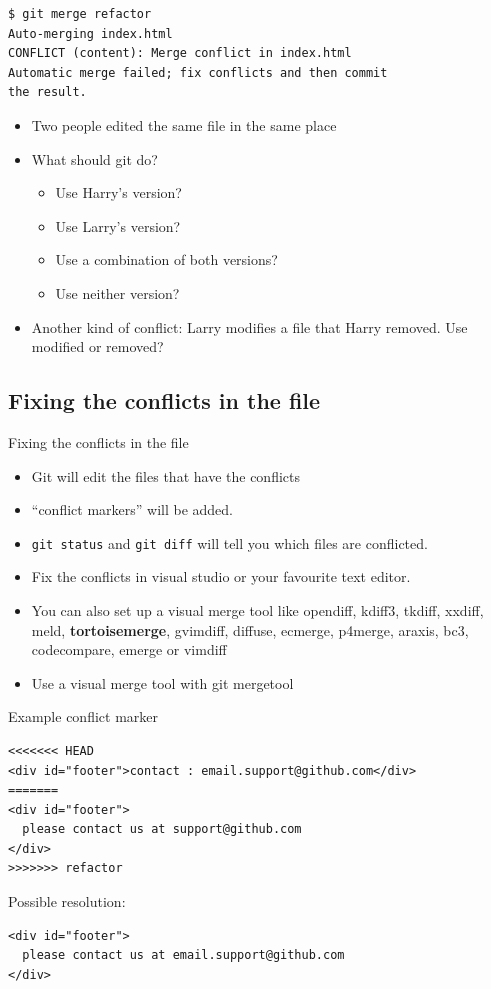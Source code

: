 \documentclass[10pt,a4paper]{beamer}
\begin{document}
\begin{frame}[fragile]
\begin{verbatim}
$ git merge refactor
Auto-merging index.html
CONFLICT (content): Merge conflict in index.html
Automatic merge failed; fix conflicts and then commit
the result.
\end{verbatim}
\begin{itemize}
	\item Two people edited the same file in the same place
	\item What should git do?
	\begin{itemize}
	\item Use Harry's version?
	\item Use Larry's version?
	\item Use a combination of both versions?
	\item Use neither version?
	\end{itemize}

	\item Another kind of conflict: Larry modifies a file that Harry removed. Use modified or removed?
\end{itemize}
\end{frame}

\subsection{Fixing the conflicts in the file}
\begin{frame}[fragile]{Fixing the conflicts in the file}
\begin{itemize}
\item Git will edit the files that have the conflicts
\item ``conflict markers'' will be added.
\item \texttt{git status} and \texttt{git diff} will tell you which files are conflicted.
\item Fix the conflicts in visual studio or your favourite text editor.
\item You can also set up a visual merge tool like opendiff, kdiff3, tkdiff, xxdiff, meld, \textbf{tortoisemerge}, gvimdiff, diffuse, ecmerge, p4merge, araxis, bc3, codecompare, emerge or vimdiff
\item Use a visual merge tool with git mergetool
\end{itemize}
\end{frame}

\begin{frame}[fragile]{Example conflict marker}
\begin{verbatim}
<<<<<<< HEAD
<div id="footer">contact : email.support@github.com</div>
=======
<div id="footer">
  please contact us at support@github.com
</div>
>>>>>>> refactor
\end{verbatim}

Possible resolution:
\begin{verbatim}
<div id="footer">
  please contact us at email.support@github.com
</div>
\end{verbatim}
\end{frame}
\end{document}
